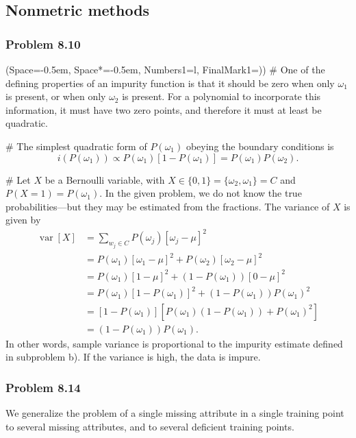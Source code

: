 \documentclass[12pt, a4paper]{article}
\newcommand{\listSpace}{-0.5em}%
\DeclareMathOperator{\var}{\operatorname{var}}
\begin{document}
{\clearpage
\subsection{Nonmetric methods}
\subsubsection*{Problem 8.10}
\begin{easylist}[enumerate]
\ListProperties(Space=\listSpace, Space*=\listSpace, Numbers1=l, FinalMark1={)})
# One of the defining properties of an impurity function is that it should be zero when only $\omega_1$ is present, or when only $\omega_2$ is present.
For a polynomial to incorporate this information, it must have two zero points, and therefore it must at least be quadratic.

# The simplest quadratic form of $P(\omega_1)$ obeying the boundary conditions is
\begin{equation*}
	i(P(\omega_1)) \propto P(\omega_1) \left[1 -  P(\omega_1)\right] =  P(\omega_1) P(\omega_2).
\end{equation*}

# Let $X$ be a Bernoulli variable, with $X \in \{0, 1\} = \{\omega_2, \omega_1 \} = C$ and $P(X = 1) = P(\omega_1)$.
In the given problem, we do not know the true probabilities---but they may be estimated from the fractions.
The variance of $X$ is given by
\begin{align*}
	\var \left[ X \right] &= \sum_{w_j \in C} P( \omega_j) \left[ \omega_j - \mu \right]^2 \\
	&= P( \omega_1) \left[ \omega_1 - \mu \right]^2 + P( \omega_2) \left[ \omega_2 - \mu \right]^2 \\
	&= P( \omega_1) \left[ 1 - \mu \right]^2 + \left( 1 - P( \omega_1) \right) \left[ 0 - \mu \right]^2 \\
	&= P( \omega_1) \left[ 1 - P( \omega_1) \right]^2 + \left( 1 - P( \omega_1) \right) P( \omega_1)^2 \\
	&=  \left[ 1 - P( \omega_1) \right] \left[ P( \omega_1) \left(1 - P( \omega_1)\right) + P( \omega_1)^2 \right] \\
	&= \left( 1 - P( \omega_1) \right) P( \omega_1).
\end{align*}
In other words, sample variance is proportional to the impurity estimate defined in subproblem b).
If the variance is high, the data is impure.
\end{easylist}


\subsubsection*{Problem 8.14}
We generalize the problem of a single missing attribute in a single training point to several missing attributes, and to several deficient training points.

}
\end{document}
